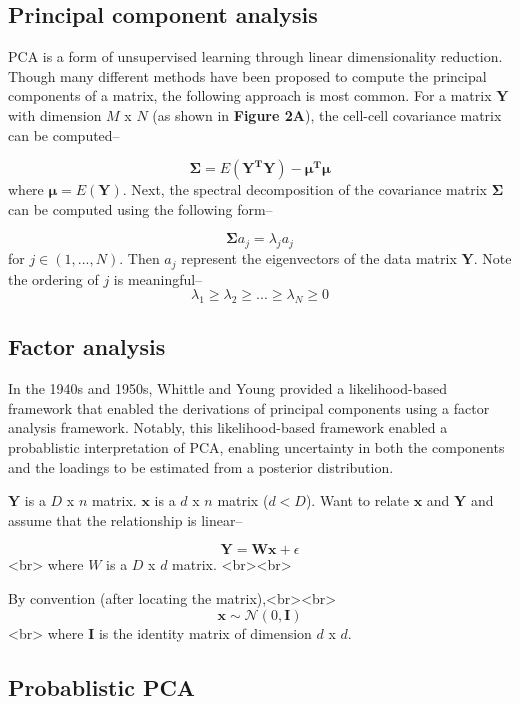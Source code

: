\documentclass[english, 11pt]{article}\usepackage[]{graphicx}\usepackage[]{color}
\begin{document}
\subsection{Principal component analysis}

PCA is a form of unsupervised learning through linear dimensionality reduction. Though many different methods have been proposed to compute the principal components of a matrix, the following approach is most common. For a matrix $\mathbf{Y}$ with dimension $M$ x $N$  (as shown in \textbf{Figure 2A}), the cell-cell covariance matrix can be computed--

$$ \mathbf{\Sigma} = E(\mathbf{Y^{T}Y}) - \mathbf{\mu^T\mu}$$
where $\mathbf{\mu} = E(\mathbf{Y})$. Next, the spectral decomposition of the covariance matrix $\mathbf{\Sigma}$ can be computed using the following form--

$$\mathbf{\Sigma} a_j = \lambda_j a_j$$
for $j \in (1, ..., N)$. Then $a_j$ represent the eigenvectors of the data matrix $\mathbf{Y}$. Note the ordering of $j$ is meaningful-- 
$$ \lambda_1 \geq \lambda_2 \geq ... \geq \lambda_N \geq 0$$

\subsection{Factor analysis}

In the 1940s and 1950s, Whittle \cite{whittle1952principal} and Young \cite{young1941maximum} provided a likelihood-based framework that enabled the derivations of principal components using a factor analysis framework. Notably, this likelihood-based framework enabled a probablistic interpretation of PCA, enabling uncertainty in both the components and the loadings to be estimated from a posterior distribution. 

$\mathbf{Y}$ is a $D$ x $n$ matrix. $\mathbf{x}$ is a $d$ x $n$ matrix ($d < D$). Want to relate $\mathbf{x}$ and $\mathbf{Y}$ and assume that the relationship is linear--

$$ \mathbf{Y = Wx} + \epsilon$$<br>
where $W$ is a $D$ x $d$ matrix. <br><br>

By convention (after locating the matrix),<br><br> $$\mathbf{x} \sim \mathcal{N} (0, \mathbf{I})$$<br>
where $\mathbf{I}$ is the identity matrix of dimension $d$ x $d$. 

\subsection{Probablistic PCA}
\end{document}
